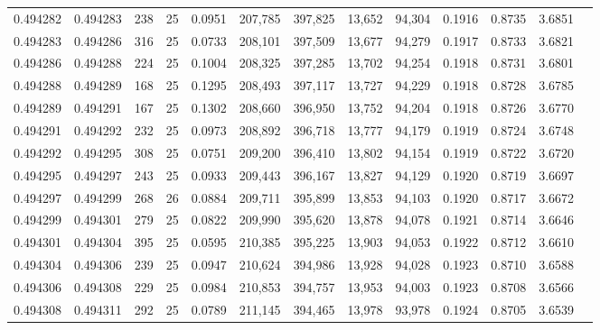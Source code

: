 \begin{tabular}{rrrrrrrrrrrrr}
0.494282 & 0.494283 &   238 &  25 &                                     0.0951 & 207,785 & 397,825 &  13,652 &  94,304 & 0.1916 & 0.8735 & 3.6851 \\
0.494283 & 0.494286 &   316 &  25 &                                     0.0733 & 208,101 & 397,509 &  13,677 &  94,279 & 0.1917 & 0.8733 & 3.6821 \\
0.494286 & 0.494288 &   224 &  25 &                                     0.1004 & 208,325 & 397,285 &  13,702 &  94,254 & 0.1918 & 0.8731 & 3.6801 \\
0.494288 & 0.494289 &   168 &  25 &                                     0.1295 & 208,493 & 397,117 &  13,727 &  94,229 & 0.1918 & 0.8728 & 3.6785 \\
0.494289 & 0.494291 &   167 &  25 &                                     0.1302 & 208,660 & 396,950 &  13,752 &  94,204 & 0.1918 & 0.8726 & 3.6770 \\
0.494291 & 0.494292 &   232 &  25 &                                     0.0973 & 208,892 & 396,718 &  13,777 &  94,179 & 0.1919 & 0.8724 & 3.6748 \\
0.494292 & 0.494295 &   308 &  25 &                                     0.0751 & 209,200 & 396,410 &  13,802 &  94,154 & 0.1919 & 0.8722 & 3.6720 \\
0.494295 & 0.494297 &   243 &  25 &                                     0.0933 & 209,443 & 396,167 &  13,827 &  94,129 & 0.1920 & 0.8719 & 3.6697 \\
0.494297 & 0.494299 &   268 &  26 &                                     0.0884 & 209,711 & 395,899 &  13,853 &  94,103 & 0.1920 & 0.8717 & 3.6672 \\
0.494299 & 0.494301 &   279 &  25 &                                     0.0822 & 209,990 & 395,620 &  13,878 &  94,078 & 0.1921 & 0.8714 & 3.6646 \\
0.494301 & 0.494304 &   395 &  25 &                                     0.0595 & 210,385 & 395,225 &  13,903 &  94,053 & 0.1922 & 0.8712 & 3.6610 \\
0.494304 & 0.494306 &   239 &  25 &                                     0.0947 & 210,624 & 394,986 &  13,928 &  94,028 & 0.1923 & 0.8710 & 3.6588 \\
0.494306 & 0.494308 &   229 &  25 &                                     0.0984 & 210,853 & 394,757 &  13,953 &  94,003 & 0.1923 & 0.8708 & 3.6566 \\
0.494308 & 0.494311 &   292 &  25 &                                     0.0789 & 211,145 & 394,465 &  13,978 &  93,978 & 0.1924 & 0.8705 & 3.6539 \\

\end{tabular}

